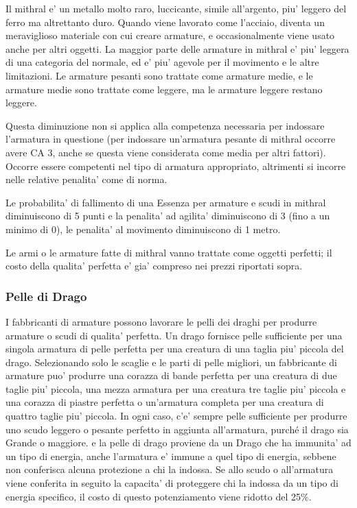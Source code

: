 \documentclass[a4paper,11pt,twoside,openany]{book}
\begin{document}
{Il mithral e' un metallo molto raro, luccicante, simile all'argento, piu' leggero del ferro ma altrettanto duro. Quando viene lavorato come l'acciaio, diventa un meraviglioso materiale con cui creare armature, e occasionalmente viene usato anche per altri oggetti. La maggior parte delle armature in mithral e' piu' leggera di una categoria del normale, ed e' piu' agevole per il movimento e le altre limitazioni. Le armature pesanti sono trattate come armature medie, e le armature medie sono trattate come leggere, ma le armature leggere restano leggere.

Questa diminuzione non si applica alla competenza necessaria per indossare l'armatura in questione (per indossare un'armatura pesante di mithral occorre avere CA 3, anche se questa viene considerata come media per altri fattori). Occorre essere competenti nel tipo di armatura appropriato, altrimenti si incorre nelle relative penalita' come di norma.

Le probabilita' di fallimento di una Essenza per armature e scudi in mithral diminuiscono di 5 punti e la penalita' ad agilita' diminuiscono di 3 (fino a un minimo di 0), le penalita' al movimento diminuiscono di 1 metro.

Le armi o le armature fatte di mithral vanno trattate come oggetti perfetti; il costo della qualita' perfetta e' gia' compreso nei prezzi riportati sopra.

\subsubsection{Pelle di Drago}

\label{pelle-di-drago}

I fabbricanti di armature possono lavorare le pelli dei draghi per produrre armature o scudi di qualita' perfetta.
Un drago fornisce pelle sufficiente per una singola armatura di pelle perfetta per una creatura di una taglia piu' piccola del drago. Selezionando solo le scaglie e le parti di pelle migliori, un fabbricante di armature puo' produrre una corazza di bande perfetta per una creatura di due taglie piu' piccola, una mezza armatura per una creatura tre taglie piu' piccola e una corazza di piastre perfetta o un'armatura completa per una creatura di quattro taglie piu' piccola. In ogni caso, c'e' sempre pelle sufficiente per produrre uno scudo leggero o pesante perfetto in aggiunta all'armatura, purché il drago sia Grande o maggiore. 
e la pelle di drago proviene da un Drago che ha immunita' ad un tipo di energia, anche l'armatura e' immune a quel tipo di energia, sebbene non conferisca alcuna protezione a chi la indossa. Se allo scudo o all'armatura viene conferita in seguito la capacita' di proteggere chi la indossa da un tipo di energia specifico, il costo di questo potenziamento viene ridotto del 25\%.

}
\end{document}
